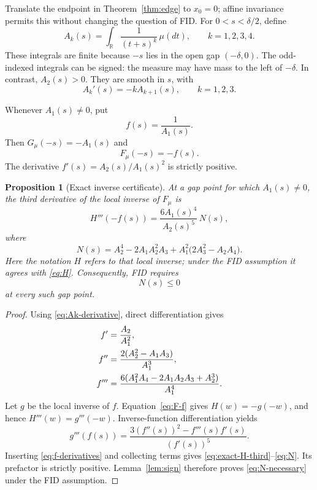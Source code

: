 \documentclass[11pt,a4paper]{article}
\newtheorem{proposition}[theorem]{Proposition}
\theoremstyle{definition}
\theoremstyle{remark}
\newcommand{\R}{\mathbb R}
\begin{document}
Translate the endpoint in Theorem~\ref{thm:edge} to $x_0=0$; affine
invariance permits this without changing the question of FID.
For $0<s<\delta/2$, define
\begin{equation}\label{eq:Ak}
 A_k(s)=\int_\R\frac{1}{(t+s)^k}\,\mu(dt),
 \qquad k=1,2,3,4.
\end{equation}
These integrals are finite because $-s$ lies in the open gap
$(-\delta,0)$. The odd-indexed integrals can be signed: the measure
may have mass to the left of $-\delta$. In contrast, $A_2(s)>0$.
They are smooth in $s$, with
\begin{equation}\label{eq:Ak-derivative}
 A_k'(s)=-kA_{k+1}(s),\qquad k=1,2,3.
\end{equation}

Whenever $A_1(s)\ne0$, put
\begin{equation}\label{eq:f}
 f(s)=\frac1{A_1(s)}.
\end{equation}
Then $G_\mu(-s)=-A_1(s)$ and
\begin{equation}\label{eq:F-f}
 F_\mu(-s)=-f(s).
\end{equation}
The derivative $f'(s)=A_2(s)/A_1(s)^2$ is strictly positive.

\begin{proposition}[Exact inverse certificate]\label{prop:N}
At a gap point for which $A_1(s)\ne0$, the third derivative of the
local inverse of $F_\mu$ is
\begin{equation}\label{eq:exact-H-third}
 H'''(-f(s))
 =\frac{6A_1(s)^4}{A_2(s)^5}\,N(s),
\end{equation}
where
\begin{equation}\label{eq:N}
 N(s)=A_2^4-2A_1A_2^2A_3
       +A_1^2\bigl(2A_3^2-A_2A_4\bigr).
\end{equation}
Here the notation $H$ refers to that local inverse; under the FID
assumption it agrees with \eqref{eq:H}. Consequently, FID requires
\begin{equation}\label{eq:N-necessary}
 N(s)\le0
\end{equation}
at every such gap point.
\end{proposition}

\begin{proof}
Using \eqref{eq:Ak-derivative}, direct differentiation gives
\begin{align}
 f'&=\frac{A_2}{A_1^2},\notag\\
 f''&=\frac{2(A_2^2-A_1A_3)}{A_1^3},\label{eq:f-derivatives}\\
 f'''&=\frac{6(A_1^2A_4-2A_1A_2A_3+A_2^3)}{A_1^4}.\notag
\end{align}
Let $g$ be the local inverse of $f$. Equation~\eqref{eq:F-f} gives
$H(w)=-g(-w)$, and hence $H'''(w)=g'''(-w)$. Inverse-function
differentiation yields
\[
 g'''(f(s))=\frac{3(f''(s))^2-f'''(s)f'(s)}{(f'(s))^5}.
\]
Inserting \eqref{eq:f-derivatives} and collecting terms gives
\eqref{eq:exact-H-third}--\eqref{eq:N}. Its prefactor is strictly
positive. Lemma~\ref{lem:sign} therefore proves
\eqref{eq:N-necessary} under the FID assumption.
\end{proof}
\end{document}

